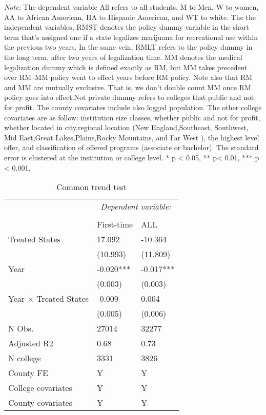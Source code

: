 \documentclass[12pt]{article}%
\begin{document}
\textit{Note:}  The dependent variable All refers to all students, M to Men, W to women, AA to African American, HA to Hispanic American, and WT to white. The the independent variables, RMST denotes the policy dummy variable in the short term that's assigned one if a state legalizes marijuana for recreational use within the previous two years. In the same vein, RMLT refers to the policy dummy in the long term, after two years of legalization time. MM denotes the medical legalization dummy which is defined exactly as RM, but MM takes precedent over RM--MM policy went to effect years before RM policy. Note also that RM and MM are mutually exclusive. That is, we don't double count MM once RM policy goes into effect.Not private dummy refers to colleges that public and not for profit. The county covariates include also logged population. The other college covariates are as follow: institution size classes, whether public and not for profit, whether located in city,regional location (New England,Southeast, Southwest, Mid East,Great Lakes,Plains,Rocky Mountains, and Far West ), the highest level offer, and  classification of offered programs (associate or bachelor). The standard error is clustered at the institution or college level.    * p \textless{} 0.05, ** p\textless{} 0.01, *** p \textless{} 0.001.
\FloatBarrier
\begin{table}\centering 
  \begin{threeparttable}
  \caption{Common trend  test }
   \label{table:ct}
\begin{tabular}{lll}
\toprule
 &  \multicolumn{2}{c}{\textit{Dependent variable:}} \\ 
\cline{2-3} 
\\[-1.8ex] 
& First-time & ALL \\
\midrule
Treated States & 17.092 & -10.364 \\
& (10.993) & (11.809) \\
Year & -0.020*** & -0.017*** \\
& (0.003) & (0.003) \\
Year $\times$ Treated States & -0.009 & 0.004 \\
& (0.005) & (0.006) \\
\hline
N Obs. & 27014 & 32277 \\
Adjusted R2 & 0.68 & 0.73 \\
N college & 3331 & 3826 \\
County FE & Y & Y \\
College covariates & Y & Y \\
County covariates & Y & Y \\
\bottomrule
\end{tabular}
  \end{threeparttable}
 
\end{table}
\FloatBarrier
\end{document}
